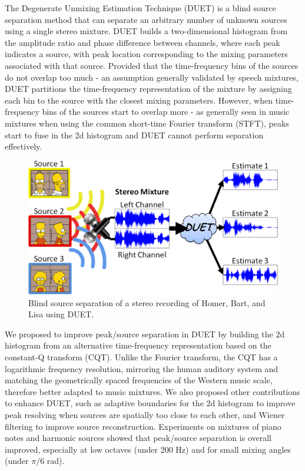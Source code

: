 \documentclass{article}
\begin{document}
The Degenerate Unmixing Estimation Technique (DUET) is a blind source separation method that can separate an arbitrary number of unknown sources using a single stereo mixture. DUET builds a two-dimensional histogram from the amplitude ratio and phase difference between channels, where each peak indicates a source, with peak location corresponding to the mixing parameters associated with that source. Provided that the time-frequency bins of the sources do not overlap too much - an assumption generally validated by speech mixtures, DUET partitions the time-frequency representation of the mixture by assigning each bin to the source with the closest mixing parameters. However, when time-frequency bins of the sources start to overlap more - as generally seen in music mixtures when using the common short-time Fourier transform (STFT), peaks start to fuse in the 2d histogram and DUET cannot perform separation effectively.

\begin{figure}[htb]
\centering
\includegraphics[width=\columnwidth]{Images/duet.png}
\caption{Blind source separation of a stereo recording of Homer, Bart, and Lisa using DUET.}
\label{fig:duet}
\end{figure}

We proposed to improve peak/source separation in DUET by building the 2d histogram from an alternative time-frequency representation based on the constant-Q transform (CQT). Unlike the Fourier transform, the CQT has a logarithmic frequency resolution, mirroring the human auditory system and matching the geometrically spaced frequencies of the Western music scale, therefore better adapted to music mixtures. We also proposed other contributions to enhance DUET, such as adaptive boundaries for the 2d histogram to improve peak resolving when sources are spatially too close to each other, and Wiener filtering to improve source reconstruction. Experiments on mixtures of piano notes and harmonic sources showed that peak/source separation is overall improved, especially at low octaves (under 200 Hz) and for small mixing angles (under ${\pi}/{6}$ rad).
\end{document}
